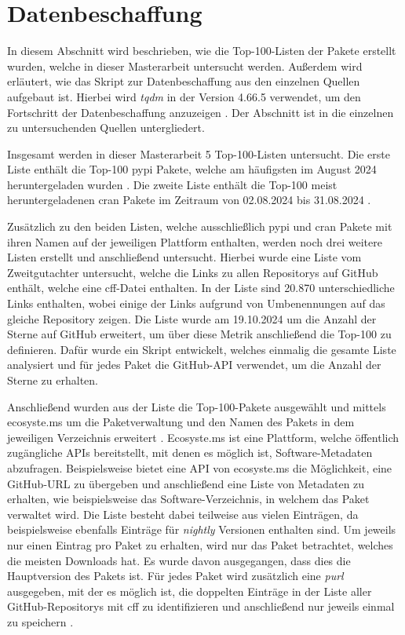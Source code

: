 \section{Datenbeschaffung}
\label{sec:datenbeschaffung}
In diesem Abschnitt wird beschrieben, wie die Top-100-Listen der Pakete erstellt wurden, welche in dieser Masterarbeit untersucht werden.
Außerdem wird erläutert, wie das Skript zur Datenbeschaffung aus den einzelnen Quellen aufgebaut ist.
Hierbei wird \emph{tqdm} in der Version 4.66.5 verwendet, um den Fortschritt der Datenbeschaffung anzuzeigen \autocite{costa-luis_tqdm_2024}.
Der Abschnitt ist in die einzelnen zu untersuchenden Quellen untergliedert.

Insgesamt werden in dieser Masterarbeit 5 Top-100-Listen untersucht.
Die erste Liste enthält die Top-100 \gls{pypi} Pakete, welche am häufigsten im August 2024 heruntergeladen wurden \autocite{kemenade_top-pypi-packages_2024}.
Die zweite Liste enthält die Top-100 meist heruntergeladenen \gls{cran} Pakete im Zeitraum von 02.08.2024 bis 31.08.2024 \autocite{csardi_cranlogsapp_2024}.

Zusätzlich zu den beiden Listen, welche ausschließlich \gls{pypi} und \gls{cran} Pakete mit ihren Namen auf der jeweiligen Plattform enthalten, werden noch drei weitere Listen erstellt und anschließend untersucht.
Hierbei wurde eine Liste vom Zweitgutachter untersucht, welche die Links zu allen Repositorys auf GitHub enthält, welche eine \gls{cff}-Datei enthalten.
In der Liste sind 20.870 unterschiedliche Links enthalten, wobei einige der Links aufgrund von Umbenennungen auf das gleiche Repository zeigen.
Die Liste wurde am 19.10.2024 um die Anzahl der Sterne auf GitHub erweitert, um über diese Metrik anschließend die Top-100 zu definieren.
Dafür wurde ein Skript entwickelt, welches einmalig die gesamte Liste analysiert und für jedes Paket die GitHub-API verwendet, um die Anzahl der Sterne zu erhalten.

Anschließend wurden aus der Liste die Top-100-Pakete ausgewählt und mittels ecosyste.ms um die Paketverwaltung und den Namen des Pakets in dem jeweiligen Verzeichnis erweitert \autocite{nesbitt_ecosystems_2024}.
Ecosyste.ms ist eine Plattform, welche öffentlich zugängliche APIs bereitstellt, mit denen es möglich ist, Software-Metadaten abzufragen.
Beispielsweise bietet eine API von ecosyste.ms die Möglichkeit, eine GitHub-URL zu übergeben und anschließend eine Liste von Metadaten zu erhalten, wie beispielsweise das Software-Verzeichnis, in welchem das Paket verwaltet wird.
Die Liste besteht dabei teilweise aus vielen Einträgen, da beispielsweise ebenfalls Einträge für \emph{nightly} Versionen enthalten sind.
Um jeweils nur einen Eintrag pro Paket zu erhalten, wird nur das Paket betrachtet, welches die meisten Downloads hat.
Es wurde davon ausgegangen, dass dies die Hauptversion des Pakets ist.
Für jedes Paket wird zusätzlich eine \emph{purl} ausgegeben, mit der es möglich ist, die doppelten Einträge in der Liste aller GitHub-Repositorys mit \gls{cff} zu identifizieren und anschließend nur jeweils einmal zu speichern \autocites{ombredanne_purl-spec_2024}{nesbitt_ecosystems_2024}.

